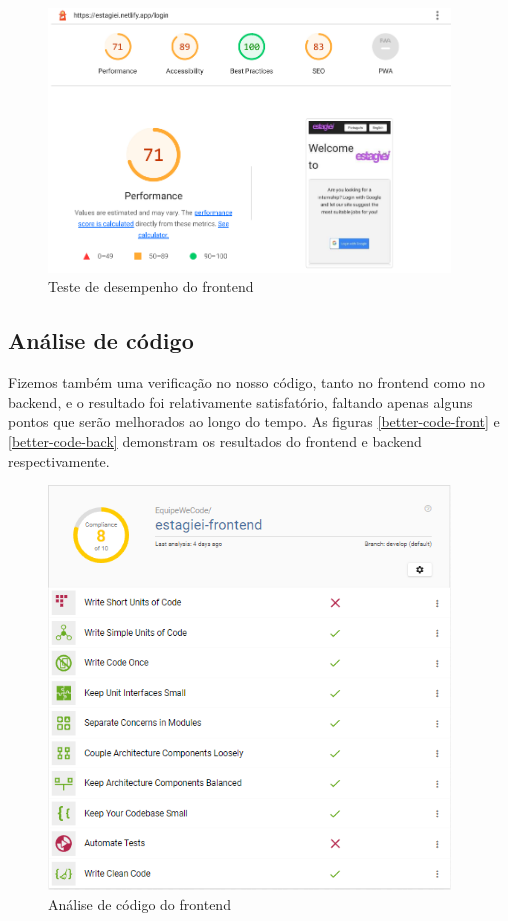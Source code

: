 \begin{figure}[H]
	\centering
	\caption{\label{lighthouse-test}Teste de desempenho do \gls{frontend}}
	\includegraphics[width=0.95\textwidth]{../imagens/web-tests/lighthouse-test.png}
\end{figure}

\subsection{Análise de código}
Fizemos também uma verificação no nosso código, tanto no \gls{frontend} como no \gls{backend}, e o resultado foi relativamente satisfatório, faltando apenas alguns pontos que serão melhorados ao longo do tempo. As figuras \autoref{better-code-front} e \autoref{better-code-back} demonstram os resultados do \gls{frontend} e \gls{backend} respectivamente.

\begin{figure}[H]
	\centering
	\caption{\label{better-code-front}Análise de código do \gls{frontend}}
	\includegraphics[width=0.95\textwidth]{../imagens/web-tests/better-code-front.png}
\end{figure}


